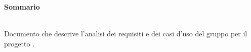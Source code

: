 \noindent\begin{Large}\textbf{Sommario}\end{Large}\\
\noindent
Documento che descrive l’analisi dei requisiti e dei casi d’uso del gruppo \gruppo{} per il progetto \progetto{}.